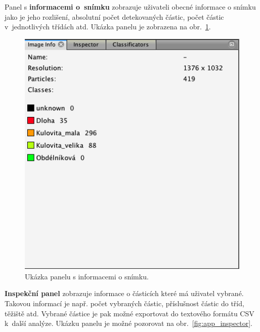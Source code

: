 \documentclass[11pt,twoside,a4paper,table]{book}
\begin{document}
Panel s \textbf{informacemi o~snímku} zobrazuje uživateli obecné informace o snímku jako je jeho rozlišení, absolutní počet detekovaných částic, počet částic v~jednotlivých třídách atd. Ukázka panelu je zobrazena na obr.~\ref{fig:app_image_info}.

\begin{figure}[hp]
	\centering
	\includegraphics[scale=0.5]{figures/app_image_info.png}
	\caption{Ukázka panelu s informacemi o snímku.}
	\label{fig:app_image_info}
\end{figure}

\textbf{Inspekční panel} zobrazuje informace o částicích které má uživatel vybrané. Takovou informací je např. počet vybraných částic, příslušnost částic do tříd, těžiště atd. Vybrané částice je pak možné exportovat do textového formátu CSV k~další analýze. Ukázku panelu je možné pozorovat na obr.~\ref{fig:app_inspector}.
\end{document}
